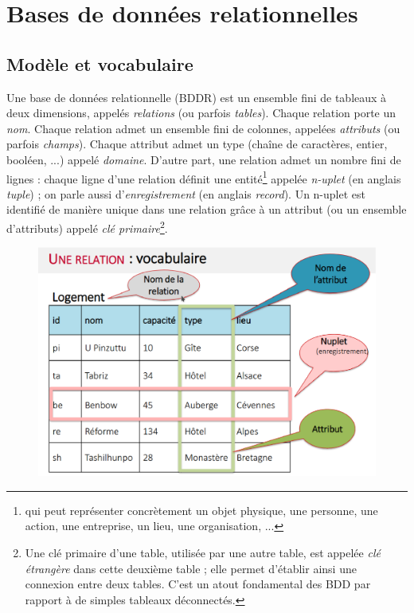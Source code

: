 \documentclass[french,11pt,twoside]{VcCours}
\begin{document}



\section{Bases de données relationnelles}

\subsection{Modèle et vocabulaire}

\begin{Definition}{}
Une base de données relationnelle (BDDR) est un ensemble fini de tableaux à deux dimensions, appelés \emph{relations} (ou parfois \emph{tables}). Chaque relation porte un \emph{nom}. Chaque relation admet un ensemble fini de colonnes, appelées \emph{attributs} (ou parfois \emph{champs}). Chaque attribut admet un type (chaîne de caractères, entier, booléen, ...) appelé \emph{domaine}. D'autre part, une relation admet un nombre fini de lignes : chaque ligne d'une relation définit une entité\footnote{qui peut représenter concrètement un objet physique, une personne, une action, une entreprise, un lieu, une organisation, ...} appelée \emph{n-uplet} (en anglais \emph{tuple}) ; on parle aussi d'\emph{enregistrement} (en anglais \emph{record}). Un n-uplet est identifié de manière unique dans une relation grâce à un attribut (ou un ensemble d'attributs) appelé \emph{clé primaire}\footnote{Une clé primaire d'une table, utilisée par une autre table, est appelée \emph{clé étrangère} dans cette deuxième table ; elle permet d'établir ainsi une connexion entre deux tables. C'est un atout fondamental des BDD par rapport à de simples tableaux déconnectés.}.
\end{Definition}



\begin{figure}[ht]
\centering
\includegraphics[width=12cm]{voca_graphique.eps}
\end{figure}
\end{document}
